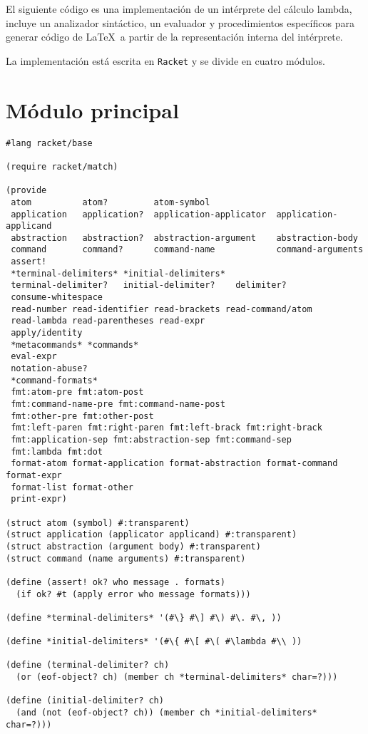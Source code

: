 El siguiente código es una implementación de un intérprete del cálculo lambda, incluye un analizador sintáctico, un evaluador y procedimientos específicos para generar código de \LaTeX~a partir de la representación interna del intérprete.

La implementación está escrita en \texttt{Racket} y se divide en cuatro módulos.


\section{Módulo principal}
\label{ap:2:principal}

\begin{lstlisting}[language=racket]
#lang racket/base

(require racket/match)

(provide
 atom          atom?         atom-symbol
 application   application?  application-applicator  application-applicand
 abstraction   abstraction?  abstraction-argument    abstraction-body
 command       command?      command-name            command-arguments
 assert!
 *terminal-delimiters* *initial-delimiters*
 terminal-delimiter?   initial-delimiter?    delimiter?
 consume-whitespace
 read-number read-identifier read-brackets read-command/atom
 read-lambda read-parentheses read-expr
 apply/identity
 *metacommands* *commands*
 eval-expr
 notation-abuse?
 *command-formats*
 fmt:atom-pre fmt:atom-post
 fmt:command-name-pre fmt:command-name-post
 fmt:other-pre fmt:other-post
 fmt:left-paren fmt:right-paren fmt:left-brack fmt:right-brack
 fmt:application-sep fmt:abstraction-sep fmt:command-sep
 fmt:lambda fmt:dot
 format-atom format-application format-abstraction format-command format-expr
 format-list format-other
 print-expr)

(struct atom (symbol) #:transparent)
(struct application (applicator applicand) #:transparent)
(struct abstraction (argument body) #:transparent)
(struct command (name arguments) #:transparent)

(define (assert! ok? who message . formats)
  (if ok? #t (apply error who message formats)))

(define *terminal-delimiters* '(#\} #\] #\) #\. #\, ))

(define *initial-delimiters* '(#\{ #\[ #\( #\lambda #\\ ))

(define (terminal-delimiter? ch)
  (or (eof-object? ch) (member ch *terminal-delimiters* char=?)))

(define (initial-delimiter? ch)
  (and (not (eof-object? ch)) (member ch *initial-delimiters* char=?)))


\end{lstlisting}
